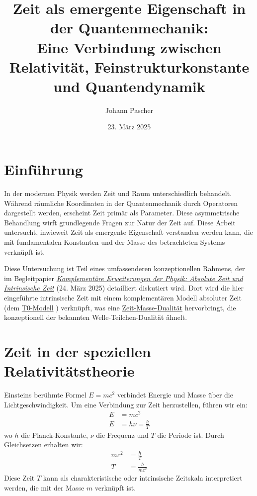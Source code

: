 \documentclass[12pt,a4paper]{article}
\title{Zeit als emergente Eigenschaft in der Quantenmechanik: \\Eine Verbindung zwischen Relativität, Feinstrukturkonstante und Quantendynamik}
\author{Johann Pascher}
\date{23. März 2025}
\begin{document}
	
	\maketitle
	
	\tableofcontents
	\newpage
	
	\section{Einführung}
	In der modernen Physik werden Zeit und Raum unterschiedlich behandelt. Während räumliche Koordinaten in der Quantenmechanik durch Operatoren dargestellt werden, erscheint Zeit primär als Parameter. Diese asymmetrische Behandlung wirft grundlegende Fragen zur Natur der Zeit auf. Diese Arbeit untersucht, inwieweit Zeit als emergente Eigenschaft verstanden werden kann, die mit fundamentalen Konstanten und der Masse des betrachteten Systems verknüpft ist.
	
	Diese Untersuchung ist Teil eines umfassenderen konzeptionellen Rahmens, der im Begleitpapier \href{https://github.com/jpascher/T0-Time-Mass-Duality/tree/main/2/pdf/Deutsch/KomplementPhysikZeit.pdf}{\textit{Komplementäre Erweiterungen der Physik: Absolute Zeit und Intrinsische Zeit}} \cite{pascher1} (24. März 2025) detailliert diskutiert wird. Dort wird die hier eingeführte intrinsische Zeit mit einem komplementären Modell absoluter Zeit (dem \href{https://github.com/jpascher/T0-Time-Mass-Duality/tree/main/2/pdf/Deutsch/ZeitMasseT0Params.pdf}{T0-Modell} \cite{pascher_params_2025}) verknüpft, was eine \href{https://github.com/jpascher/T0-Time-Mass-Duality/tree/main/2/pdf/Deutsch/MathZeitMasseLagrange.pdf}{Zeit-Masse-Dualität} \cite{pascher_lagrange_2025} hervorbringt, die konzeptionell der bekannten Welle-Teilchen-Dualität ähnelt.
	
	\section{Zeit in der speziellen Relativitätstheorie}
	Einsteins berühmte Formel \( E = mc^2 \) verbindet Energie und Masse über die Lichtgeschwindigkeit. Um eine Verbindung zur Zeit herzustellen, führen wir ein:
	\begin{align}
		E &= mc^2 \\
		E &= h\nu = \frac{h}{T}
	\end{align}
	wo \( h \) die Planck-Konstante, \( \nu \) die Frequenz und \( T \) die Periode ist. Durch Gleichsetzen erhalten wir:
	\begin{align}
		mc^2 &= \frac{h}{T} \\
		T &= \frac{h}{mc^2}
	\end{align}
	Diese Zeit \( T \) kann als charakteristische oder intrinsische Zeitskala interpretiert werden, die mit der Masse \( m \) verknüpft ist.
	
\end{document}
